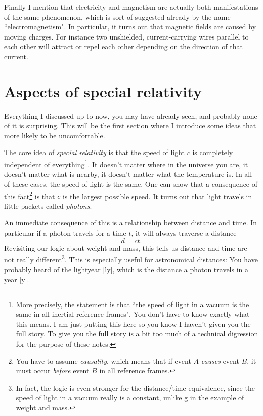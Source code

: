 Finally I mention that electricity and magnetism are actually both
manifestations of the same phenomenon, which is sort of suggested already by the
name ``electromagnetism". In particular, it turns out that magnetic fields are
caused by moving charges. For instance two unshielded, current-carrying wires
parallel to each other will attract or repel each other depending on the
direction of that current.

\section{Aspects of special relativity}\label{sec:SR}

Everything I discussed up to now, you may have already seen, and probably none
of it is surprising. This will be the first section where I introduce some 
ideas that more likely to be uncomfortable. 

The core idea of {\it special relativity} is that the speed of light $c$ is completely independent 
of everything\footnote{More precisely, the statement is that ``the speed of light in a 
vacuum is the same in all inertial reference frames". You don't have to know exactly 
what this means. I am just putting this here so you know I haven’t given you the full 
story. To give you the full story is a bit too much of a technical digression for the 
purpose of these notes.}. 
It doesn’t matter where in the universe you are, it doesn’t matter what is 
nearby, it doesn’t matter what the temperature is. In all of these cases, the speed of light 
is the same. One can show that a consequence of this fact\footnote{You have to
assume {\it causality}, which means that if event $A$ {\it
causes} event $B$, it must occur {\it before} event $B$ in all reference
frames.} is that $c$ is the largest possible speed.
It turns out that light travels in little packets called {\it photons}.

An immediate consequence of this is a relationship between distance and time. In particular 
if a photon travels for a time $t$, it will always traverse a distance
\begin{equation}
d=ct.
\end{equation}
Revisiting our logic about weight and mass, this tells us distance and time are not 
really different\footnote{In fact, the logic is even stronger for the
distance/time equivalence, since the speed of light in a vacuum really is a
constant, unlike g in the example of weight and mass.}. This is especially
useful for astronomical distances: You have probably heard of the lightyear [ly],
which is the distance a photon travels in a year [y].

